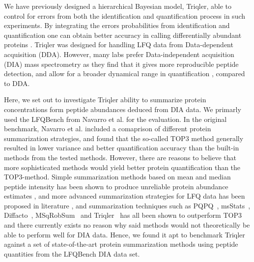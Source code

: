 \documentclass[10pt,letterpaper]{article}
\begin{document}
We have previously designed a hierarchical Bayesian model, Triqler, able to control for errors from both the identification and quantification process in such experiments\cite{The2018Integrated}. By integrating the errors probabilities from identification and quantification one can obtain better accuracy in calling differentially abundant proteins \cite{The2018Integrated}.   Triqler was designed for handling LFQ data from Data-dependent acquisition (DDA). However, many labs prefer Data-independent acquisition (DIA) mass spectrometry \cite{venable2004automated} as they find that it gives more reproducible peptide detection, and allow for a broader dynamical range in quantification \cite{bern2010deconvolution,zhang2020DIA}, compared to DDA. 

Here, we set out to investigate Triqler ability to summarize protein concentrations form peptide abundances deduced from DIA data. We primarly used the LFQBench from Navarro et al. \cite{navarro2016multicenter} for the evaluation. In the original benchmark, Navarro et al. included a comaprison of different protein summarization strategies, and found that the so-called TOP3 method generally resulted in lower variance and better quantification accuracy than the built-in methods from the tested methods\cite{navarro2016multicenter}. However, there are reasons to believe that more sophisticated methods would yield better protein quantification than the TOP3-method. Simple summarization methods based on mean and median peptide intensity has been shown to produce unreliable protein abundance estimates \cite{goeminne2015summarization}, and more advanced summarization strategies for LFQ data has been proposed in literature \cite{silva2006absolute,cox2014accurate}, and summarization techniques such as PQPQ~\cite{forshed2011enhanced}, msStats~\cite{choi2014msstats}, Diffacto~\cite{zhang2017covariation}, MSqRobSum~\cite{sticker2020robust} and Triqler~\cite{The2018Integrated} has all been shown to outperform TOP3 and there currently exists no reason why said methods would not theoretically be able to perform well for DIA data. Hence, we found it apt to benchmark Triqler against a set of state-of-the-art protein summarization methods using peptide quantities from the LFQBench DIA data set.


 
\end{document}
